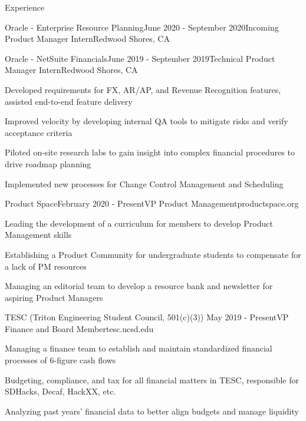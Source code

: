 \documentclass{resume} %
\begin{document}
\begin{rSection}{\faCode{ }}{Experience}

\begin{rSubsection}{}{Oracle - Enterprise Resource Planning}{June 2020 - September 2020}{Incoming Product Manager Intern}{Redwood Shores, CA}
\end{rSubsection}

\begin{rSubsection}{}{Oracle - NetSuite Financials}{June 2019 - September 2019}{Technical Product Manager Intern}{Redwood Shores, CA}
\item Developed requirements for FX, AR/AP, and Revenue Recognition features, assisted end-to-end feature delivery
\item Improved velocity by developing internal QA tools to mitigate risks and verify acceptance criteria
\item Piloted on-site research labs to gain insight into complex financial procedures to drive roadmap planning
\item Implemented new processes for Change Control Management and Scheduling
\end{rSubsection}

\begin{rSubsection}{}{Product Space}{February 2020 - Present}{VP Product Management}{productspace.org}
\item Leading the development of a curriculum for members to develop Product Management skills
\item Establishing a Product Community for undergraduate students to compensate for a lack of PM resources
\item Managing an editorial team to develop a resource bank and newsletter for aspiring Product Managers
\end{rSubsection}

\begin{rSubsection}{}{TESC (Triton Engineering Student Council, 501(c)(3)) }{May 2019 - Present}{VP Finance and Board Member}{tesc.ucsd.edu}
\item Managing a finance team to establish and maintain standardized financial processes of 6-figure cash flows
\item Budgeting, compliance, and tax for all financial matters in TESC, responsible for SDHacks, Decaf, HackXX, etc.
\item Analyzing past years' financial data to better align budgets and manage liquidity
\end{rSubsection}


\end{rSection}
\end{document}
